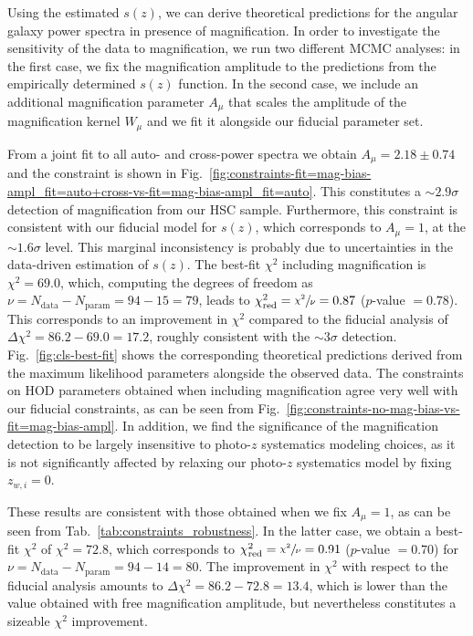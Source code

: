 \documentclass[a4paper,11pt]{article}
\begin{document}
    Using the estimated $s(z)$, we can derive theoretical predictions for the angular galaxy power spectra in presence of magnification. In order to investigate the sensitivity of the data to magnification, we run two different MCMC analyses: in the first case, we fix the magnification amplitude to the predictions from the empirically determined $s(z)$ function. In the second case, we include an additional magnification parameter $A_{\mu}$ that scales the amplitude of the magnification kernel $W_{\mu}$ and we fit it alongside our fiducial parameter set.

    From a joint fit to all auto- and cross-power spectra we obtain $A_{\mu} = 2.18 \pm 0.74$ and the constraint is shown in Fig.~\ref{fig:constraints-fit=mag-bias-ampl_fit=auto+cross-vs-fit=mag-bias-ampl_fit=auto}. This constitutes a $\sim 2.9 \sigma$ detection of magnification from our HSC sample. Furthermore, this constraint is consistent with our fiducial model for $s(z)$, which corresponds to $A_{\mu} = 1$, at the $\sim 1.6 \sigma$ level. This marginal inconsistency is probably due to uncertainties in the data-driven estimation of $s(z)$. The best-fit $\chi^{2}$ including magnification is $\chi^{2} = 69.0$, which, computing the degrees of freedom as $\nu = N_{\mathrm{data}} - N_{\mathrm{param}} = 94 - 15 = 79$, leads to $\chi^{2}_{\mathrm{red}} = \sfrac{\chi^{2}}{\nu} = 0.87$ ($p$-value $= 0.78$). This corresponds to an improvement in $\chi^{2}$ compared to the fiducial analysis of $\Delta \chi^{2} = 86.2 - 69.0 = 17.2$, roughly consistent with the $\sim 3 \sigma$ detection. Fig.~\ref{fig:cls-best-fit} shows the corresponding theoretical predictions derived from the maximum likelihood parameters alongside the observed data. The constraints on HOD parameters obtained when including magnification agree very well with our fiducial constraints, as can be seen from Fig.~\ref{fig:constraints-no-mag-bias-vs-fit=mag-bias-ampl}. In addition, we find the significance of the magnification detection to be largely insensitive to photo-$z$ systematics modeling choices, as it is not significantly affected by relaxing our photo-$z$ systematics model by fixing $z_{w, i} = 0$. 

    These results are consistent with those obtained when we fix $A_{\mu} = 1$, as can be seen from Tab.~\ref{tab:constraints_robustness}. In the latter case, we obtain a best-fit $\chi^{2}$ of $\chi^{2} = 72.8$, which corresponds to $\chi^{2}_{\mathrm{red}} = \sfrac{\chi^{2}}{\nu} = 0.91$ ($p$-value $= 0.70$) for $\nu = N_{\mathrm{data}} - N_{\mathrm{param}} = 94 - 14 = 80$. The improvement in $\chi^{2}$ with respect to the fiducial analysis amounts to $\Delta \chi^{2} = 86.2 - 72.8 = 13.4$, which is lower than the value obtained with free magnification amplitude, but nevertheless constitutes a sizeable $\chi^{2}$ improvement.
\end{document}
